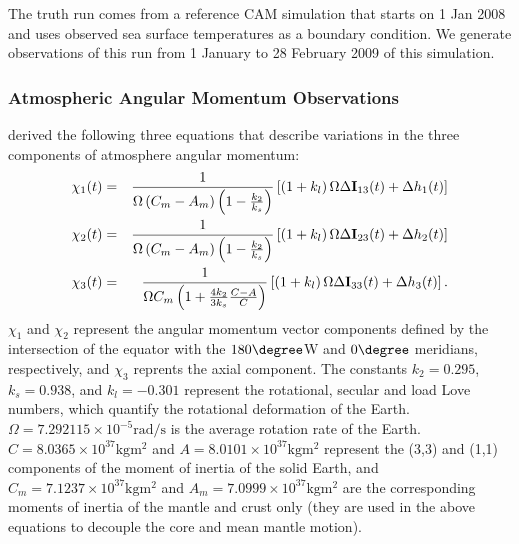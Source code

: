 The truth run comes from a reference CAM simulation that starts on 1 Jan 2008 and uses observed sea surface temperatures as a boundary condition. 
We generate observations of this run from 1 January to 28 February 2009 of this simulation. 


\subsubsection{Atmospheric Angular Momentum Observations}
\label{sec:AAM}
\citet{barnesetal1983} derived the following three equations that describe variations in the three components of atmosphere angular momentum:  
\begin{eqnarray}
{\bf \chi}_{1}(t) &=& \frac{1}{\Omega \left( C_m-A_m \right)\left(1-\frac{k_2}{k_s}  \right)}
\left[ \left(1+k_l \right) \Omega \Delta {\bf I}_{13}(t) + \Delta h_1(t)  \right] \label{eq:X1} \\
{\bf \chi}_{2}(t) &=& \frac{1}{\Omega \left( C_m-A_m \right)\left(1-\frac{k_2}{k_s}  \right)}
\left[ \left(1+k_l \right) \Omega \Delta {\bf I}_{23}(t) + \Delta h_2(t)  \right] \label{eq:X2} \\
{\bf \chi}_{3}(t) &=& \frac{1}{\Omega C_m \left(1+\frac{4k_2}{3k_s}\frac{C-A}{C} \right)}
\left[ \left(1+k_l \right) \Omega \Delta {\bf I}_{33}(t) + \Delta h_{3}(t) \label{eq:X3} \right].
\end{eqnarray}
%
$\chi_1$ and $\chi_2$ represent the angular momentum vector components defined by the intersection of the equator with the $180\degree$W and $0\degree$ meridians, respectively, and $\chi_3$ reprents the axial component.
%
The constants 
$k_2 = 0.295$, 
$k_s = 0.938$, and 
$k_l = -0.301$
represent the rotational, secular and load Love numbers, which quantify the rotational deformation of the Earth.
$\Omega = 7.292115\times 10^{-5} \text{rad}/\text{s}$ is the average rotation rate  of the Earth. 
$C = 8.0365 \times 10^{37} \text{kg} \text{m}^2$ and $A = 8.0101 \times 10^{37} \text{kg} \text{m}^2$ represent the (3,3) and (1,1) components of the moment of inertia of the solid Earth, and $C_m = 7.1237\times 10^{37}  \text{kg} \text{m}^2$ and $A_m = 7.0999\times 10^{37} \text{kg} \text{m}^2$ are the corresponding moments of inertia of the mantle and crust only (they are used in the above equations to decouple the core and mean mantle motion).  




